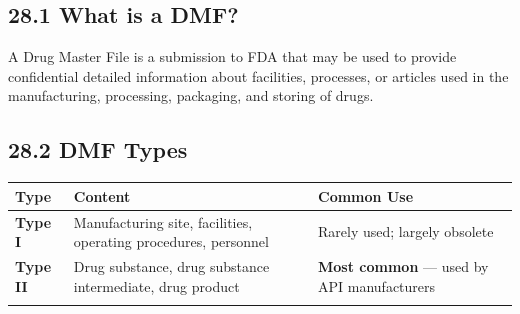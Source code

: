 \documentclass[
  11pt,
  a4paper,
]{report}
\begin{document}
\hypertarget{what-is-a-dmf}{%
\subsection{28.1 What is a DMF?}\label{what-is-a-dmf}}

A Drug Master File is a submission to FDA that may be used to provide
confidential detailed information about facilities, processes, or
articles used in the manufacturing, processing, packaging, and storing
of drugs.

\hypertarget{dmf-types}{%
\subsection{28.2 DMF Types}\label{dmf-types}}

\begin{longtable}[]{@{}lll@{}}
\toprule
\begin{minipage}[b]{0.21\columnwidth}\raggedright
Type\strut
\end{minipage} & \begin{minipage}[b]{0.32\columnwidth}\raggedright
Content\strut
\end{minipage} & \begin{minipage}[b]{0.39\columnwidth}\raggedright
Common Use\strut
\end{minipage}\tabularnewline
\midrule
\endhead
\begin{minipage}[t]{0.21\columnwidth}\raggedright
\textbf{Type I}\strut
\end{minipage} & \begin{minipage}[t]{0.32\columnwidth}\raggedright
Manufacturing site, facilities, operating procedures, personnel\strut
\end{minipage} & \begin{minipage}[t]{0.39\columnwidth}\raggedright
Rarely used; largely obsolete\strut
\end{minipage}\tabularnewline
\begin{minipage}[t]{0.21\columnwidth}\raggedright
\textbf{Type II}\strut
\end{minipage} & \begin{minipage}[t]{0.32\columnwidth}\raggedright
Drug substance, drug substance intermediate, drug product\strut
\end{minipage} & \begin{minipage}[t]{0.39\columnwidth}\raggedright
\textbf{Most common} --- used by API manufacturers\strut
\end{minipage}\tabularnewline
\begin{minipage}[t]{0.21\columnwidth}\raggedright

\end{minipage}
\end{longtable}
\end{document}
